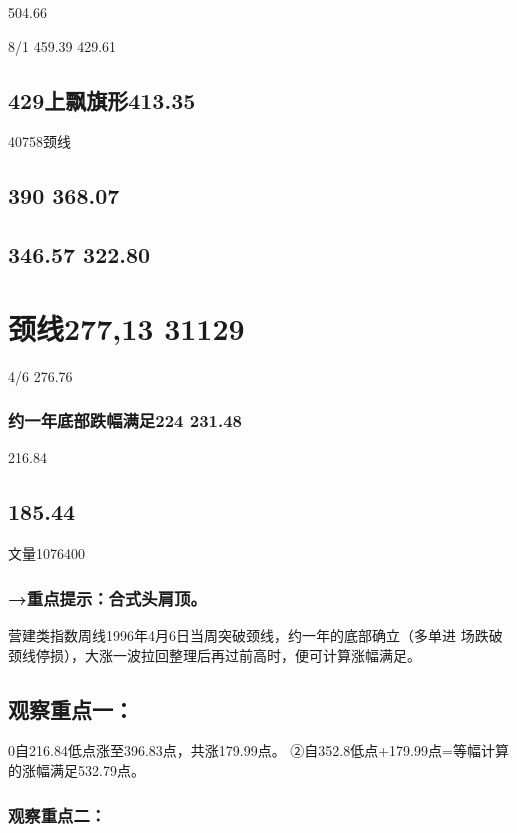 \documentclass{article}
\begin{document}
504.66

8/1 459.39 429.61

\subsection{429上飘旗形413.35}

40758颈线

\subsection{390 368.07}

\subsection{346.57 322.80}

\section{颈线277,13 31129}

4/6 276.76

\subsubsection{约一年底部跌幅满足224 231.48}

216.84

\subsection{185.44}

文量1076400

\subsubsection{→重点提示：合式头肩顶。}

营建类指数周线1996年4月6日当周突破颈线，约一年的底部确立（多单进 场跌破颈线停损），大涨一波拉回整理后再过前高时，便可计算涨幅满足。

\subsection{观察重点一：}

0自216.84低点涨至396.83点，共涨179.99点。 ②自352.8低点+179.99点=等幅计算的涨幅满足532.79点。

\subsubsection{观察重点二：}
\end{document}
